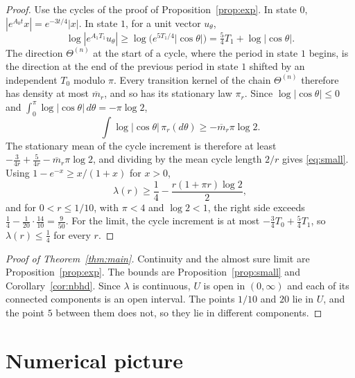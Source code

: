 \documentclass[11pt]{amsart}
\begin{document}
\begin{proof}
Use the cycles of the proof of Proposition~\ref{prop:exp}. In state $0$, $|e^{A_0t}x|=e^{-3t/4}|x|$. In state $1$,
for a unit vector $u_\theta$,
\[
\log|e^{A_1T_1}u_\theta|\ge\log\bigl(e^{5T_1/4}|\cos\theta|\bigr)=\tfrac54T_1+\log|\cos\theta| .
\]
The direction $\Theta^{(n)}$ at the start of a cycle, where the period in state $1$ begins, is the direction at the
end of the previous period in state $1$ shifted by an independent $T_0$ modulo $\pi$. Every transition kernel of the
chain $\Theta^{(n)}$ therefore has density at most $\overline m_r$, and so has its stationary law $\pi_r$. Since
$\log|\cos\theta|\le0$ and $\int_0^\pi\log|\cos\theta|\,d\theta=-\pi\log2$,
\[
\int\log|\cos\theta|\,\pi_r(d\theta)\ge-\overline m_r\pi\log2 .
\]
The stationary mean of the cycle increment is therefore at least $-\frac3{4r}+\frac5{4r}-\overline m_r\pi\log2$, and dividing by
the mean cycle length $2/r$ gives \eqref{eq:small}. Using $1-e^{-x}\ge x/(1+x)$ for $x>0$,
\[
\lambda(r)\ge\frac14-\frac{r(1+\pi r)\log2}{2},
\]
and for $0<r\le1/10$, with $\pi<4$ and $\log2<1$, the right side exceeds $\frac14-\frac1{20}\cdot\frac{14}{10}=\frac9{50}$.
For the limit, the cycle increment is at most $-\frac34T_0+\frac54T_1$, so $\lambda(r)\le\frac14$ for every $r$.
\end{proof}

\begin{proof}[Proof of Theorem~\ref{thm:main}]
Continuity and the almost sure limit are Proposition~\ref{prop:exp}. The bounds are
Proposition~\ref{prop:small} and Corollary~\ref{cor:nbhd}. Since $\lambda$ is continuous, $U$ is open in $(0,\infty)$
and each of its connected components is an open interval. The points $1/10$ and $20$ lie in $U$, and the point $5$
between them does not, so they lie in different components.
\end{proof}

\section{Numerical picture}\label{sec:numerics}
\end{document}

